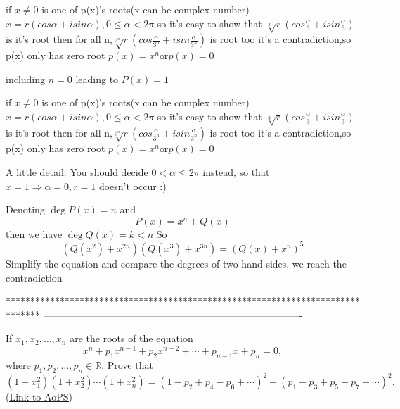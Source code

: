 \begin{solution}
	\begin{tcolorbox}if $ x\neq0$ is one of p(x)'s roots(x can be complex number)
$ x = r(cos\alpha + isin\alpha),0\le \alpha < 2\pi$
so it's easy to show that $ \sqrt [3]{r}(cos\frac {\alpha}{3} + isin\frac {\alpha}{3})$ is it's root
then for all n,$ \sqrt [3^{n}]{r}(cos\frac {\alpha}{3^{n}} + isin\frac {\alpha}{3^{n}})$ is root too  
it's a contradiction,so p(x) only has zero root
$ p(x) = x^{n}$or$ p(x) = 0$\end{tcolorbox}

including $ n=0$ leading to $ P(x)=1$
\end{solution}



\begin{solution}
	\begin{tcolorbox}if $ x\neq0$ is one of p(x)'s roots(x can be complex number)
$ x = r(cos\alpha + isin\alpha),0\le \alpha < 2\pi$
so it's easy to show that $ \sqrt [3]{r}(cos\frac {\alpha}{3} + isin\frac {\alpha}{3})$ is it's root
then for all n,$ \sqrt [3^{n}]{r}(cos\frac {\alpha}{3^{n}} + isin\frac {\alpha}{3^{n}})$ is root too  
it's a contradiction,so p(x) only has zero root
$ p(x) = x^{n}$or$ p(x) = 0$\end{tcolorbox}
A little detail: You should decide $ 0 < \alpha \le 2\pi$ instead, so that $ x = 1 \Rightarrow \alpha = 0, r = 1$ doesn't occur :)
\end{solution}



\begin{solution}
	Denoting $ \deg P(x)=n$ and
\[ P\left( x \right) = {x^n} + Q\left( x \right)\]
then we have $ \deg Q\left( x \right) = k < n$
So
\[ \left( {Q\left( {{x^2}} \right) + {x^{2n}}} \right)\left( {Q\left( {{x^3}} \right) + {x^{3n}}} \right) = {\left( {Q\left( x \right) + {x^n}} \right)^5}\]
Simplify the equation and compare the degrees of two hand sides, we reach the contradiction
\end{solution}
*******************************************************************************
-------------------------------------------------------------------------------

\begin{problem}
	If $x_1 ,x_2, \ldots ,x_n$  are the roots of the equation \[x^n+p_1 x^{n-1}+p_2 x^{n-2}+ \cdots +p_{n-1}x+p_n=0,\] where $p_1,p_2, \ldots, p_n \in \mathbb R$. Prove that \[ (1+x_1 ^2)(1+x_2 ^2)\cdots (1+x_n ^2)=(1-p_2+p_4-p_6+\cdots)^2+(p_1-p_3+p_5-p_7+\cdots)^2.\]
	\flushright \href{https://artofproblemsolving.com/community/c6h307056}{(Link to AoPS)}
\end{problem}



